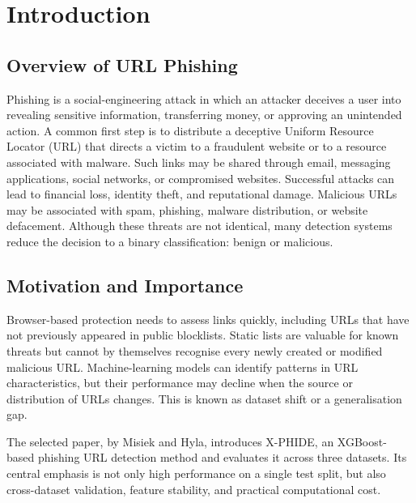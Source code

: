 \chapter{Introduction}
\setcounter{equation}{0}
\section{Overview of URL Phishing}
Phishing is a social-engineering attack in which an attacker deceives a user into revealing sensitive information, transferring money, or approving an unintended action. A common first step is to distribute a deceptive Uniform Resource Locator (URL) that directs a victim to a fraudulent website or to a resource associated with malware. Such links may be shared through email, messaging applications, social networks, or compromised websites. Successful attacks can lead to financial loss, identity theft, and reputational damage. Malicious URLs may be associated with spam, phishing, malware distribution, or website defacement. Although these threats are not identical, many detection systems reduce the decision to a binary classification: benign or malicious.\cite{bib1}

\section{Motivation and Importance}
Browser-based protection needs to assess links quickly, including URLs that have not previously appeared in public blocklists. Static lists are valuable for known threats but cannot by themselves recognise every newly created or modified malicious URL. Machine-learning models can identify patterns in URL characteristics, but their performance may decline when the source or distribution of URLs changes. This is known as dataset shift or a generalisation gap.

The selected paper, by Misiek and Hyla, introduces X-PHIDE, an XGBoost-based phishing URL detection method and evaluates it across three datasets. Its central emphasis is not only high performance on a single test split, but also cross-dataset validation, feature stability, and practical computational cost.\cite{bib1}

